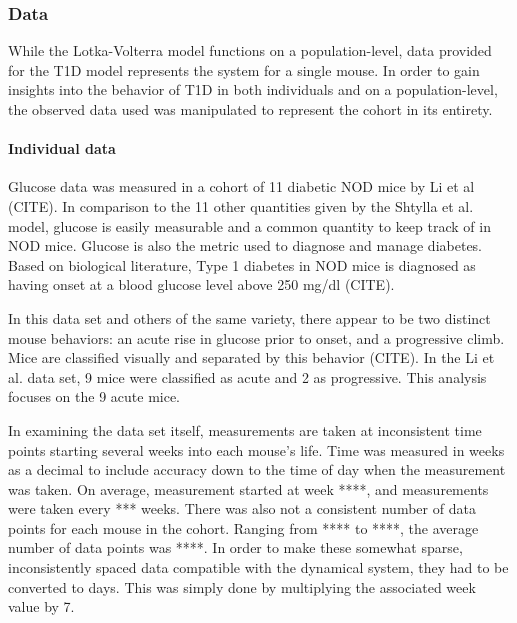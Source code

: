 \documentclass{article}
\begin{document}
\subsubsection{Data}
While the Lotka-Volterra model functions on a population-level, data provided for the T1D model represents the system for a single mouse. In order to gain insights into the behavior of T1D in both individuals and on a population-level, the observed data used was manipulated to represent the cohort in its entirety. 

\paragraph{Individual data} \label{section:Individual_data}
Glucose data was measured in a cohort of 11 diabetic NOD mice by Li et al (CITE). In comparison to the 11 other quantities given by the Shtylla et al. model, glucose is easily measurable and a common quantity to keep track of in NOD mice. Glucose is also the metric used to diagnose and manage diabetes. Based on biological literature, Type 1 diabetes in NOD mice is diagnosed as having onset at a blood glucose level above 250 mg/dl (CITE).
\par In this data set and others of the same variety, there appear to be two distinct mouse behaviors: an acute rise in glucose prior to onset, and a progressive climb. Mice are classified visually and separated by this behavior (CITE). In the Li et al. data set, 9 mice were classified as acute and 2 as progressive. This analysis focuses on the 9 acute mice. 
\par In examining the data set itself, measurements are taken at inconsistent time points starting several weeks into each mouse's life. Time was measured in weeks as a decimal to include accuracy down to the time of day when the measurement was taken. On average, measurement started at week ****, and measurements were taken every *** weeks. There was also not a consistent number of data points for each mouse in the cohort. Ranging from **** to ****, the average number of data points was ****. In order to make these somewhat sparse, inconsistently spaced data compatible with the dynamical system, they had to be converted to days. This was simply done by multiplying the associated week value by 7.
\end{document}
